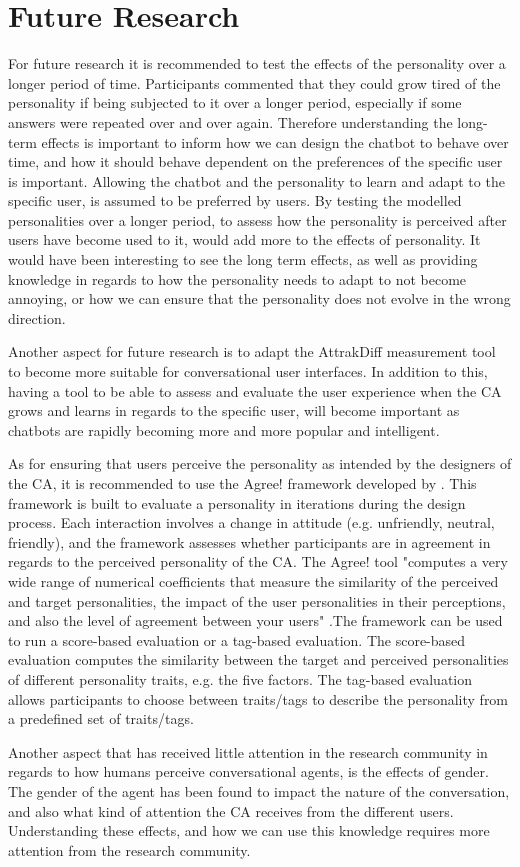 \section{Future Research}
\label{sec:future}

For future research it is recommended to test the effects of the personality over a longer period of time. Participants commented that they could grow tired of the personality if being subjected to it over a longer period, especially if some answers were repeated over and over again. Therefore understanding the long-term effects is important to inform how we can design the chatbot to behave over time, and how it should behave dependent on the preferences of the specific user is important. Allowing the chatbot and the personality to learn and adapt to the specific user, is assumed to be preferred by users. By testing the modelled personalities over a longer period, to assess how the personality is perceived after users have become used to it, would add more to the effects of personality. It would have been interesting to see the long term effects, as well as providing knowledge in regards to how the personality needs to adapt to not become annoying, or how we can ensure that the personality does not evolve in the wrong direction.

Another aspect for future research is to adapt the AttrakDiff measurement tool to become more suitable for conversational user interfaces. In addition to this, having a tool to be able to assess and evaluate the user experience when the CA grows and learns in regards to the specific user, will become important as chatbots are rapidly becoming more and more popular and intelligent.

As for ensuring that users perceive the personality as intended by the designers of the CA, it is recommended to use the Agree! framework developed by \cite{Callejas2014}. This framework is built to evaluate a personality in iterations during the design process. Each interaction involves a change in attitude (e.g. unfriendly, neutral, friendly), and the framework assesses whether participants are in agreement in regards to the perceived personality of the CA. The Agree! tool "computes a very wide range of numerical coefficients that measure the similarity of the perceived and target personalities, the impact of the user personalities in their perceptions, and also the level of agreement between your users" \citep{Callejas2014}.The framework can be used to run a score-based evaluation or a tag-based evaluation. The score-based evaluation computes the similarity between the target and perceived personalities of different personality traits, e.g. the five factors. The tag-based evaluation allows participants to choose between traits/tags to describe the personality from a predefined set of traits/tags.

Another aspect that has received little attention in the research community in regards to how humans perceive conversational agents, is the effects of gender. The gender of the agent has been found to impact the nature of the conversation, and also what kind of attention the CA receives from the different users. Understanding these effects, and how we can use this knowledge requires more attention from the research community.

